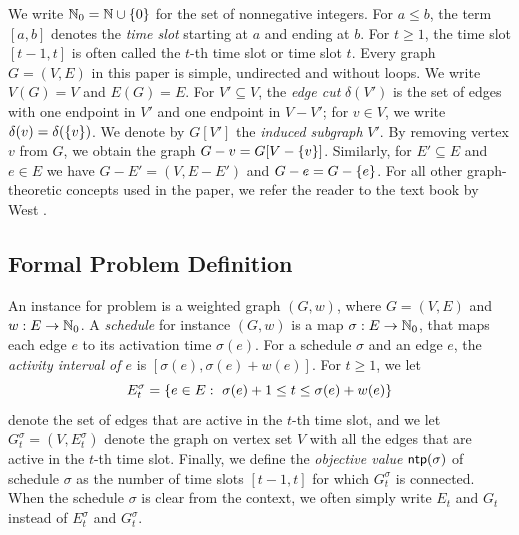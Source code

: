 We write $\mathbb{N}_0= \mathbb{N} \cup \{ 0 \}$ for the set of nonnegative integers. 
For $a\le b$, the term $[a,b]$ denotes the \emph{time slot} starting at $a$ and ending at $b$. 
For  $t\ge1$, the time slot $[t-1,t]$ is often called the $t$-th time slot or time slot $t$.
Every graph $G=(V,E)$ in this paper is simple, undirected and without loops. We write $V(G) = V$ and $E(G) = E$.
For $V'\subseteq V$, the \emph{edge cut} $\delta(V')$ is the set of edges with one endpoint 
in $V'$ and one endpoint in $V-V'$; for $v\in V$, we write $\delta(v) = \delta(\{ v \})$.
We denote by $G[V']$ the \emph{induced subgraph}  $V'$.
By removing  vertex $v$ from $G$, we obtain the graph $G-v=G[V-\{ v \}]$.
Similarly, for $E'\subseteq E$ and $e\in E$ we have $G-E'=(V,E-E')$ and $G-e=G-\{ e \}$. For all other graph-theoretic concepts used in the paper, we refer the reader to the
text book by West \cite{WestBook}.

\subsection{Formal Problem Definition}

An instance for problem {\xxxNTP} is a weighted graph $(G,w)$, where $G=(V,E)$ and $w:E\to\mathbb{N}_0$. 
A \emph{schedule} for instance $(G,w)$ is a map $\sigma:E\to\mathbb{N}_0$, that maps each edge $e$ to 
its activation time $\sigma(e)$.
For a schedule $\sigma$ and an edge $e$, the \emph{activity interval of $e$} is $[\sigma(e),\sigma(e)+w(e)]$. 
For $t\ge1$, we let 
\[E^\sigma_t= \{ e\in E:~ \sigma(e)+1 \le t \le \sigma(e)+w(e) \}\]
 denote 
the set of edges that are active in the $t$-th time slot, and we let $G^\sigma_t=(V,E^\sigma_t)$ 
denote the graph on vertex set $V$ with all the edges that are active in the $t$-th time slot. 
Finally, we define the \emph{objective value} $\operatorname{\textsf{ntp}}(\sigma)$ of schedule $\sigma$ as the number of time 
slots $[t-1,t]$ for which $G^\sigma_t$ is connected. When the schedule $\sigma$ is clear from the context, we often simply write $E_t$ and $G_t$ instead of 
$E^\sigma_t$ and $G^\sigma_t$. 


